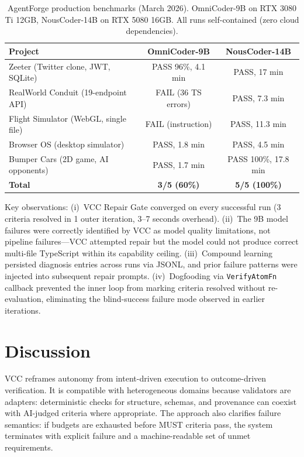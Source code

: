 \documentclass[11pt]{article}
\begin{document}
\begin{table}[t]
\centering
\caption{AgentForge production benchmarks (March 2026). OmniCoder-9B on RTX 3080 Ti 12GB, NousCoder-14B on RTX 5080 16GB. All runs self-contained (zero cloud dependencies).}
\label{tab:agentforge_benchmarks}
\begin{tabular}{lcc}
\toprule
Project & OmniCoder-9B & NousCoder-14B \\
\midrule
Zeeter (Twitter clone, JWT, SQLite) & PASS 96\%, 4.1 min & PASS, 17 min \\
RealWorld Conduit (19-endpoint API) & FAIL (36 TS errors) & PASS, 7.3 min \\
Flight Simulator (WebGL, single file) & FAIL (instruction) & PASS, 11.3 min \\
Browser OS (desktop simulator) & PASS, 1.8 min & PASS, 4.5 min \\
Bumper Cars (2D game, AI opponents) & PASS, 1.7 min & PASS 100\%, 17.8 min \\
\midrule
\textbf{Total} & \textbf{3/5 (60\%)} & \textbf{5/5 (100\%)} \\
\bottomrule
\end{tabular}
\end{table}

Key observations: (i)~VCC Repair Gate converged on every successful run (3 criteria resolved in 1 outer iteration, 3--7 seconds overhead). (ii)~The 9B model failures were correctly identified by VCC as model quality limitations, not pipeline failures---VCC attempted repair but the model could not produce correct multi-file TypeScript within its capability ceiling. (iii)~Compound learning persisted diagnosis entries across runs via JSONL, and prior failure patterns were injected into subsequent repair prompts. (iv)~Dogfooding via \texttt{VerifyAtomFn} callback prevented the inner loop from marking criteria resolved without re-evaluation, eliminating the blind-success failure mode observed in earlier iterations.

\section{Discussion}
VCC reframes autonomy from intent-driven execution to outcome-driven verification. It is compatible with heterogeneous domains because validators are adapters: deterministic checks for structure, schemas, and provenance can coexist with AI-judged criteria where appropriate. The approach also clarifies failure semantics: if budgets are exhausted before MUST criteria pass, the system terminates with explicit failure and a machine-readable set of unmet requirements.
\end{document}
